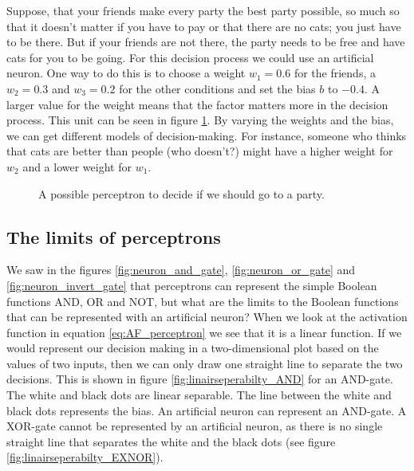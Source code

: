 Suppose, that your friends make every party the best party possible, so much so that it doesn't matter if you have to pay or that there are no cats; you just have to be there. But if your friends are not there, the party needs to be free and have cats for you to be going. For this decision process we could use an artificial neuron. One way to do this is to choose a weight $w_1=0.6$ for the friends, a $w_2=0.3$ and $w_3=0.2$ for the other conditions and set the bias $b$ to $-0.4$. A larger value for the weight means that the factor matters more in the decision process. This unit can be seen in figure \ref{fig:party_unit}. By varying the weights and the bias, we can get different models of decision-making. For instance, someone who thinks that cats are better than people (who doesn't?) might have a higher weight for $w_2$ and a lower weight for $w_1$.

\begin{figure}[h!]
\centering
{}
\caption{A possible perceptron to decide if we should go to a party.}
\label{fig:party_unit}
\end{figure}

\subsection{The limits of perceptrons}
We saw in the figures \ref{fig:neuron_and_gate}, \ref{fig:neuron_or_gate} and \ref{fig:neuron_invert_gate} that perceptrons can represent the simple Boolean functions AND, OR and NOT, but what are the limits to the Boolean functions that can be represented with an artificial neuron? When we look at the activation function in equation \ref{eq:AF_perceptron} we see that it is a linear function. If we would represent our decision making in a two-dimensional plot based on the values of two inputs, then we can only draw one straight line to separate the two decisions. This is shown in figure \ref{fig:linairseperabilty_AND} for an AND-gate. The white and black dots are linear separable. The line between the white and black dots represents the bias. An artificial neuron can represent an AND-gate. A XOR-gate cannot be represented by an artificial neuron, as there is no single straight line that separates the white and the black dots (see figure \ref{fig:linairseperabilty_EXNOR}).

